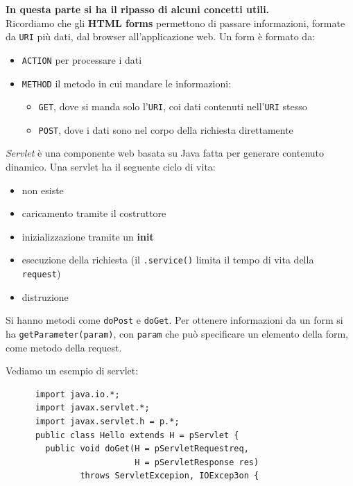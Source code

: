 \documentclass[a4paper,12pt, oneside]{book}
\begin{document}
\begin{shaded}
  \textbf{In questa parte si ha il ripasso di alcuni concetti utili.}\\
  Ricordiamo che gli \textbf{HTML forms} permettono di passare informazioni,
  formate da \texttt{URI} più dati, dal
  browser all'applicazione web. Un form è formato da:
  \begin{itemize}
    \item \texttt{ACTION} per processare i dati
    \item \texttt{METHOD} il metodo in cui mandare le informazioni:
    \begin{itemize}
      \item \texttt{GET}, dove si manda solo l'\texttt{URI}, coi dati contenuti
      nell'\texttt{URI} stesso
      \item \texttt{POST}, dove i dati sono nel corpo della richiesta
      direttamente 
    \end{itemize}
  \end{itemize}
  \textit{Servlet} è una componente web basata su Java fatta per generare
  contenuto dinamico. Una servlet ha il seguente ciclo di vita:
  \begin{itemize}
    \item non esiste
    \item caricamento tramite il costruttore
    \item inizializzazione tramite un \textbf{init}
    \item esecuzione della richiesta (il \texttt{.service()} limita il tempo di
    vita della \texttt{request})
    \item distruzione
  \end{itemize}
  Si hanno metodi come \texttt{doPost} e \texttt{doGet}. Per ottenere
  informazioni da un form si ha \texttt{getParameter(param)}, con \texttt{param}
  che può specificare un elemento della form, come metodo della request. \\
  \begin{esempio}
    Vediamo un esempio di servlet:
    \begin{verbatim}
      import java.io.*;
      import javax.servlet.*;
      import javax.servlet.h = p.*;
      public class Hello extends H = pServlet {
        public void doGet(H = pServletRequestreq,
                          H = pServletResponse res)
               throws ServletExcepion, IOExcep3on {
                            

\end{verbatim}
\end{esempio}
\end{shaded}
\end{document}

